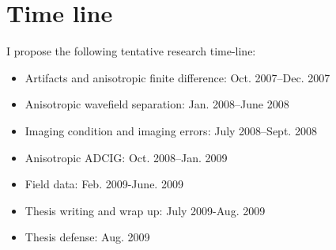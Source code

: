 \section{Time line}
I propose the following tentative research time-line:
\begin{itemize}
\item Artifacts and anisotropic finite difference: Oct. 2007--Dec. 2007
\item Anisotropic wavefield separation: Jan. 2008--June 2008
\item Imaging condition and imaging errors: July 2008--Sept. 2008
\item Anisotropic ADCIG: Oct. 2008--Jan. 2009
\item Field data: Feb. 2009-June. 2009
\item Thesis writing and wrap up: July 2009-Aug. 2009
\item Thesis defense: Aug. 2009
\end{itemize}



\newpage
\small
{}

%


